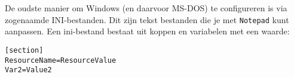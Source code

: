 De oudste manier om Windows (en daarvoor MS-DOS) te configureren is via zogenaamde INI-bestanden. Dit zijn tekst bestanden die je met \texttt{Notepad} kunt aanpassen. Een ini-bestand bestaat uit koppen en variabelen met een waarde:
\begin{lstlisting}[style=DOS]
[section]
ResourceName=ResourceValue
Var2=Value2
\end{lstlisting}


